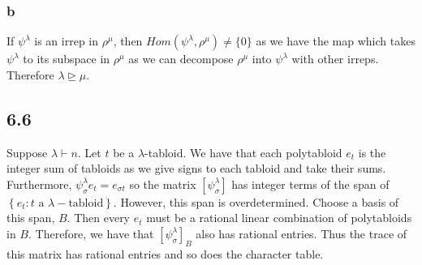 \documentclass[]{article}
\begin{document}
\subsubsection*{b}
If $\psi^\lambda$ is an irrep in $\rho^\mu$, then $Hom(\psi^\lambda, \rho^\mu) \neq \{ 0 \}$ as we have the map which takes $\psi^\lambda$ to its subspace in $\rho^\mu$ as we can decompose $\rho^\mu$ into $\psi^\lambda$ with other irreps. Therefore $\lambda \unrhd  \mu$. 

\subsection*{6.6}
Suppose $\lambda \vdash n$. Let $t$ be a $\lambda$-tabloid.
We have that each polytabloid $e_t$ is the integer sum of tabloids as we give signs to each tabloid and take their sums. Furthermore, $\psi^\lambda_\sigma e_t = e_{\sigma t}$ so the matrix $\left[\psi^\lambda_\sigma\right]$ has integer terms of the span of $\left\{ e_{t}: t \text{ a } \lambda- \text{tabloid}\right\}$. However, this span is overdetermined. Choose a basis of this span, $B$. Then every $e_t$ must be a rational linear combination of polytabloids in $B$. Therefore, we have that $\left[\psi^\lambda_\sigma\right]_B$ also has rational entries. Thus the trace of this matrix has rational entries and so does the character table. 
\end{document}
